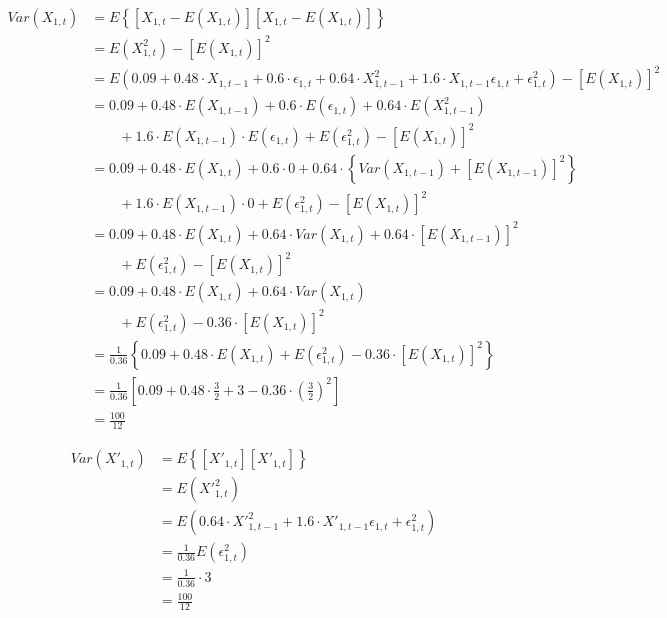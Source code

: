 \begin{solution}
\begin{equation}
\begin{aligned}
Var(X_{1,t}) 	& = E\left\{[X_{1,t} - E(X_{1,t})][X_{1,t} - E(X_{1,t})]\right\} \\
							& = E(X_{1,t}^2) - [E(X_{1,t})]^2 \\
							& = E\left(0.09 + 0.48 \cdot X_{1,t-1} + 0.6 \cdot \epsilon_{1,t} 
														  + 0.64 \cdot X_{1,t-1}^2 + 1.6 \cdot X_{1,t-1}\epsilon_{1,t} 
															+ \epsilon_{1,t}^2 \right) - [E(X_{1,t})]^2 \\
							& = 0.09 + 0.48 \cdot E(X_{1,t-1}) + 0.6 \cdot E(\epsilon_{1,t}) 
														  + 0.64 \cdot E(X_{1,t-1}^2) \\
							& \qquad				+ 1.6 \cdot E(X_{1,t-1}) \cdot E(\epsilon_{1,t}) 
									  	        + E(\epsilon_{1,t}^2) - [E(X_{1,t})]^2  \\
							& = 0.09 + 0.48 \cdot E(X_{1,t}) + 0.6 \cdot 0 
														  + 0.64 \cdot \left\{ Var(X_{1,t-1}) + \left[ E(X_{1,t-1})\right]^2 \right\} \\
							& \qquad				+ 1.6 \cdot E(X_{1,t-1}) \cdot 0 
															+ E(\epsilon_{1,t}^2) - [E(X_{1,t})]^2 \\
							& = 0.09 + 0.48 \cdot E(X_{1,t}) 
														  + 0.64 \cdot Var(X_{1,t}) + 0.64 \cdot \left[ E(X_{1,t-1})\right]^2 \\
							& \qquad				+ E(\epsilon_{1,t}^2) - [E(X_{1,t})]^2 \\
							& = 0.09 + 0.48 \cdot E(X_{1,t}) 
														  + 0.64 \cdot Var(X_{1,t}) \\
							& \qquad				+ E(\epsilon_{1,t}^2) - 0.36 \cdot [E(X_{1,t})]^2	\\
							& = \frac{1}{0.36}\left\{0.09 + 0.48 \cdot E(X_{1,t}) 
														  + E(\epsilon_{1,t}^2) - 0.36 \cdot [E(X_{1,t})]^2	\right\} \\
							& = \frac{1}{0.36}\left[0.09 + 0.48 \cdot \frac{3}{2}
														  + 3 - 0.36 \cdot \left(\frac{3}{2}\right)^2	\right] \\
							& = \frac{100}{12}								
\end{aligned}
\end{equation}

\begin{equation}
\begin{aligned}
Var(X'_{1,t}) & = E\left\{[X'_{1,t}][X'_{1,t}]\right\} \\
							& = E({X'}_{1,t}^2) \\
							& = E\left(0.64 \cdot {X'}_{1,t-1}^2 + 1.6 \cdot X'_{1,t-1}\epsilon_{1,t} 
															+ \epsilon_{1,t}^2 \right) \\
							& = \frac{1}{0.36}E(\epsilon_{1,t}^2) \\
							& = \frac{1}{0.36} \cdot 3 \\
							& = \frac{100}{12}								
\end{aligned}
\end{equation}


\end{solution}

